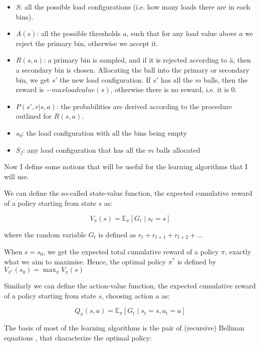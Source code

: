 \begin{itemize}
    \item 
    $S$: all the possible load configurations (i.e. how many loads there are in each bins).
    \item
    $A(s)$: all the possible thresholds $a$, such that for any load value above $a$ we reject the primary bin, otherwise we accept it.
    \item
    $R(s, a)$: a primary bin is sampled, and if it is rejected according to $ä$, then a secondary bin is chosen. Allocating the ball into the primary or secondary bin, we get $s'$ the new load configuration. If $s'$ has all the $m$ balls, then the reward is $-maxloadvalue(s)$, otherwise there is no reward, i.e. it is $0$.
    \item
    $P(s', r | s, a)$: the probabilities are derived according to the procedure outlined for $R(s,a)$.
    \item
    $s_0$: the load configuration with all the bins being empty
    \item
    $S_f$: any load configuration that has all the $m$ balls allocated
\end{itemize}


Now I define some notions that will be useful for the learning algorithms that I will use.


We can define the so-called state-value function, the expected cumulative reward of a policy starting from state $s$ as:

\begin{equation}\label{eq:statevalueFunction}
V_{\pi}(s)=\mathbb{E}_\pi[G_t \mid s_t = s]
\end{equation}

where the random variable $G_t$ is defined as $r_{t} +  r_{t+1} + r_{t+2} + ...$

When $s=s_0$, we get the expected total cumulative reward of a policy $\pi$, exactly what we aim to maximise. Hence, the optimal policy $\pi^*$ is defined by $V_{\pi^*}(s_0)=\max_\pi V_{\pi}(s)$


Similarly we can define the action-value function, the expected cumulative reward of a policy starting from state $s$, choosing action $a$ as:

\begin{equation}\label{eq:actionvalueFunction}
Q_{\pi}(s, a)=\mathbb{E}_\pi[G_t \mid s_t = s, a_t = a]
\end{equation}


The basis of most of the learning algorithms is the pair of (recursive) Bellman equations \cite{bellman1957bellmanequation}, that characterize the optimal policy:


